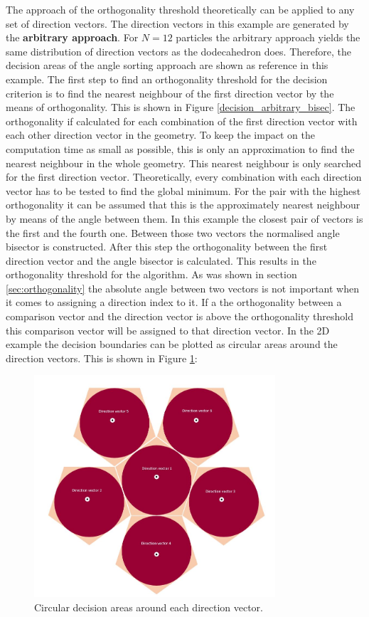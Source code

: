 The approach of the orthogonality threshold theoretically can be applied to any set of direction vectors. The direction vectors in this example are generated by the \textbf{arbitrary approach}. For $N = 12$ particles the arbitrary approach  yields the same distribution of direction vectors as the dodecahedron does. Therefore, the decision areas of the angle sorting approach are shown as reference in this example. The first step to find an orthogonality threshold for the decision criterion is to find the nearest neighbour of the first direction vector by the means of orthogonality. This is shown in Figure \ref{decision_arbitrary_bisec}. The orthogonality if calculated for each combination of the first direction vector with each other direction vector in the geometry. To keep the impact on the computation time as small as possible, this is only an approximation to find the nearest neighbour in the whole geometry. This nearest neighbour is only searched for the first direction vector. Theoretically, every combination with each direction vector has to be tested to find the global minimum. For the pair with the highest orthogonality it can be assumed that this is the approximately nearest neighbour by means of the angle between them. In this example the closest pair of vectors is the first and the fourth one. Between those two vectors the normalised angle bisector is constructed. After this step the orthogonality between the first direction vector and the angle bisector is calculated. This results in the orthogonality threshold for the algorithm. As was shown in section \ref{sec:orthogonality} the absolute angle between two vectors is not important when it comes to assigning a direction index to it. If a the orthogonality between a comparison vector and the direction vector is above the orthogonality threshold this comparison vector will be assigned to that direction vector.
In the 2D example the decision boundaries can be plotted as circular areas around the direction vectors. This is shown in Figure \ref{decision_arbitrary_circular}:

\begin{figure}[H]
    \centering
    \includegraphics[width=0.8\textwidth]{Graphics/decision_area_Circles.jpg}
    \caption{Circular decision areas around each direction vector.}
    \label{decision_arbitrary_circular}
\end{figure}

